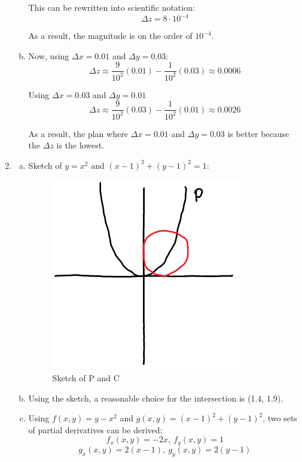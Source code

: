 \documentclass{article}
\begin{document}
\begin{enumerate}[1.]
\begin{enumerate}[a.]
        This can be rewritten into scientific notation:
        $$ \Delta z = 8 \cdot 10^{-4} $$

        As a result, the magnitude is on the order of $10^{-4}$.

      \item Now, using $\Delta x = 0.01$ and $\Delta y = 0.03$:
        $$ \Delta z \approx \frac{ 9 }{ 10^{2} }(0.01) - \frac{ 1 }{ 10^{2}
        }(0.03) \approx 0.0006 $$

        Using $\Delta x = 0.03$ and $\Delta y = 0.01$
        $$ \Delta z \approx \frac{ 9 }{ 10^{2} }(0.03) - \frac{ 1 }{ 10^{2}
        }(0.01) \approx 0.0026 $$

        As a result, the plan where $\Delta x = 0.01$ and $\Delta y = 0.03$ is
        better because the $\Delta z$ is the lowest.
    \end{enumerate}

  \item \begin{enumerate}[a.]
      \item Sketch of $y = x^{2}$ and $(x-1)^{2} + (y-1)^{2} = 1$:

        \begin{figure}[H]
          \centering
          \includegraphics[scale=0.60]{"PAndCSketch"}
          \caption{Sketch of P and C}
        \end{figure}

      \item Using the sketch, a reasonable choice for the intersection is
        (1.4, 1.9).

      \item Using $f(x,y) = y - x^{2}$ and $g(x,y) = (x-1)^{2} + (y-1)^{2}$, two
        sets of partial derivatives can be derived:
        $$ f_{x}(x,y) = -2x, \ f_{y}(x,y) = 1 $$
        $$ g_{x}(x,y) = 2(x - 1), \ g_{y}(x,y) = 2(y - 1) $$


\end{enumerate}
\end{enumerate}
\end{document}
